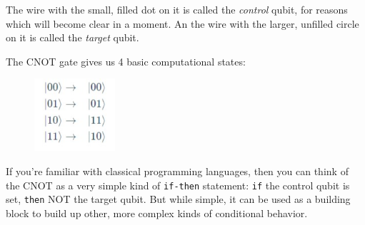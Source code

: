 \documentclass{article}
\newcommand{\code}[1]{\colorbox{light-gray}{\texttt{#1}}}
\begin{document}
The wire with the small, filled dot on it is called the \textit{control} qubit,
for reasons which will become clear in a moment. An the wire with the larger,
unfilled circle on it is called the \textit{target} qubit.

The CNOT gate gives us 4 basic computational states:

\begin{figure}[h]
    \includegraphics[width=3cm]{5.jpg}
    \centering
\end{figure}

If you're familiar with classical programming languages, then you can think of
the CNOT as a very simple kind of \code{if-then} statement: \code{if} the
control qubit is set, \code{then} NOT the target qubit. But while simple, it
can be used as a building block to build up other, more complex kinds of
conditional behavior.
\end{document}
